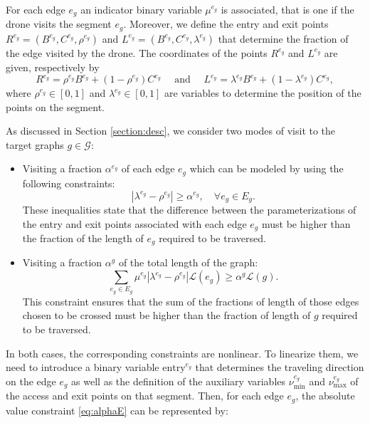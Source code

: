 \documentclass[10pt,a4paper]{elsarticle}
\newcommand{\EN}[1]{{\color{black}#1}}
\begin{document}
\noindent
For each edge $e_g$ an indicator binary variable $\mu^{e_g}$ \EN{is associated}, that is one if the drone visits the segment $e_g$. Moreover, we define the entry and exit points $R^{e_g}=(B^{e_g},C^{e_g},\rho^{e_g})$ and $L^{e_g}=(B^{e_g},C^{e_g},\lambda^{e_g})$ that determine the fraction of the edge visited by the drone. The coordinates of the points $R^{e_g}$ and $L^{e_g}$ are given, respectively by 
$$R^{e_g} = \rho^{e_g} B^{e_g} + (1- \rho^{e_g})C^{e_g} \quad\text{ and }\quad L^{e_g} = \lambda^{e_g} B^{e_g} + (1- \lambda^{e_g})C^{e_g},$$ where $\rho^{e_g} \in [0,1]$ and $\lambda^{e_g} \in [0,1]$ are variables to determine the position of the points on the segment.



\noindent
As discussed in Section \ref{section:desc}, we consider two modes of visit to the target graphs $g\in \mathcal{G}$:
\begin{itemize}
\item Visiting a fraction $\alpha^{e_g}$ of each edge $e_g$ which can be modeled by using the following constraints:
\begin{equation}\label{eq:alphaE}\tag{$\alpha$-E}
	|\lambda^{e_g} - \rho^{e_g}|\geq \alpha^{e_g}, \quad \forall e_g\in E_g.
\end{equation}
These inequalities state that the difference between the parameterizations of the entry and exit points associated \EN{with} each edge $e_g$ must be higher than the fraction of the length of $e_g$ required to be traversed.
\item Visiting a fraction $\alpha^g$ of the total length of the graph:
\begin{equation}\label{eq:alphaG}\tag{$\alpha$-G}
	\sum_{e_g\in E_g} \mu^{e_g}|\lambda^{e_g} - \rho^{e_g}|\mathcal L(e_g) \geq \alpha^g\mathcal L(g).
\end{equation}
This constraint ensures that the sum of the fractions of length of those edges chosen to be crossed must be higher than the fraction of length of $g$ required to be traversed.
\end{itemize}



\bigskip
\noindent
In both cases, the corresponding constraints are nonlinear. To linearize them, we need to introduce a binary variable $\text{entry}^{e_g}$ that determines the traveling direction on the edge $e_g$ as well as the definition of the auxiliary variables $\nu_\text{min}^{e_g}$ and $\nu_\text{max}^{e_g}$ of the access and exit points on that segment. Then, for each edge $e_g$, the absolute value constraint \eqref{eq:alphaE} can be represented by:
\end{document}
